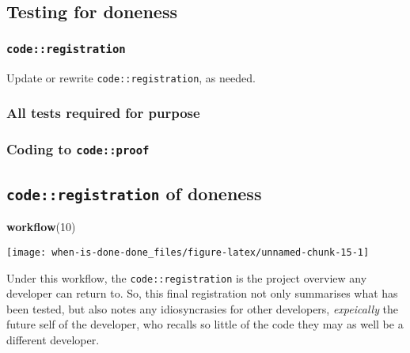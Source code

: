 \documentclass[
]{article}
\newenvironment{Shaded}{\begin{snugshade}}{\end{snugshade}}
\newcommand{\DecValTok}[1]{\textcolor[rgb]{0.00,0.00,0.81}{#1}}
\newcommand{\KeywordTok}[1]{\textcolor[rgb]{0.13,0.29,0.53}{\textbf{#1}}}
\newcommand{\NormalTok}[1]{#1}
\begin{document}
\hypertarget{testing-for-doneness}{%
\subsection{Testing for doneness}\label{testing-for-doneness}}

\hypertarget{coderegistration-4}{%
\subsubsection{\texorpdfstring{\texttt{code::registration}}{code::registration}}\label{coderegistration-4}}

Update or rewrite \texttt{code::registration}, as needed.

\hypertarget{all-tests-required-for-purpose}{%
\subsubsection{All tests required for
purpose}\label{all-tests-required-for-purpose}}

\hypertarget{coding-to-codeproof-2}{%
\subsubsection{\texorpdfstring{Coding to
\texttt{code::proof}}{Coding to code::proof}}\label{coding-to-codeproof-2}}

\hypertarget{coderegistration-of-doneness}{%
\subsection{\texorpdfstring{\texttt{code::registration} of
doneness}{code::registration of doneness}}\label{coderegistration-of-doneness}}

\begin{Shaded}
\begin{Highlighting}[]
\KeywordTok{workflow}\NormalTok{(}\DecValTok{10}\NormalTok{)}
\end{Highlighting}
\end{Shaded}

\begin{center}\texttt{[image: when-is-done-done\_files/figure-latex/unnamed-chunk-15-1]} \end{center}

Under this workflow, the \texttt{code::registration} is the project
overview any developer can return to. So, this final registration not
only summarises what has been tested, but also notes any idiosyncrasies
for other developers, \emph{expeically} the future self of the
developer, who recalls so little of the code they may as well be a
different developer.
\end{document}
